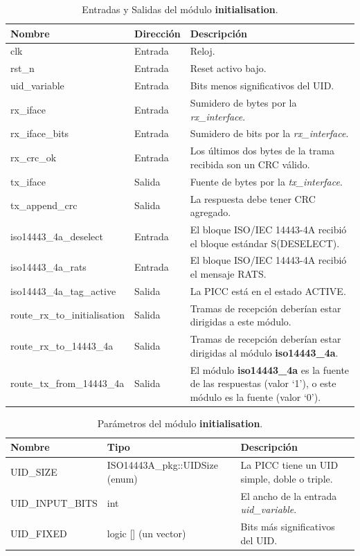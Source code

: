 \documentclass[a4paper, twoside, 11pt]{report}
\begin{document}
\begin{table}[htb]
  \centering
  \tablezebra
  \begin{tabulary}{\linewidth}{l|l|L}
    \textbf{Nombre}&\textbf{Dirección}&\textbf{Descripción} \\
    \hline
    clk&Entrada&Reloj. \\
    rst\_n&Entrada&Reset activo bajo. \\
    uid\_variable&Entrada&Bits menos significativos del UID. \\
    rx\_iface&Entrada&Sumidero de bytes por la \textit{rx\_interface}. \\
    rx\_iface\_bits&Entrada&Sumidero de bits por la \textit{rx\_interface}. \\
    rx\_crc\_ok&Entrada&Los últimos dos bytes de la trama recibida son un CRC válido. \\
    tx\_iface&Salida&Fuente de bytes por la \textit{tx\_interface}. \\
    tx\_append\_crc&Salida&La respuesta debe tener CRC agregado. \\
    iso14443\_4a\_deselect&Entrada&El bloque ISO/IEC 14443-4A recibió el bloque estándar S(DESELECT). \\
    iso14443\_4a\_rats&Entrada&El bloque ISO/IEC 14443-4A recibió el mensaje RATS. \\
    iso14443\_4a\_tag\_active&Salida&La PICC está en el estado ACTIVE. \\
    route\_rx\_to\_initialisation&Salida&Tramas de recepción deberían estar dirigidas a este módulo. \\
    route\_rx\_to\_14443\_4a&Salida&Tramas de recepción deberían estar dirigidas al módulo \textbf{iso14443\_4a}. \\
    route\_tx\_from\_14443\_4a&Salida&El módulo \textbf{iso14443\_4a} es la fuente de las respuestas (valor ‘1’), o este módulo es la fuente (valor ‘0’). \\
  \end{tabulary}
  \caption{Entradas y Salidas del módulo \textbf{initialisation}.}
  \label{tab:ports_initialisation}
\end{table}

\begin{table}[htb]
  \centering
  \tablezebra
  \begin{tabulary}{\linewidth}{l|l|L}
    \setcounter{rownum}{0}
    \textbf{Nombre}&\textbf{Tipo}&\textbf{Descripción} \\
    \hline
    UID\_SIZE&ISO14443A\_pkg::UIDSize (enum)&La PICC tiene un UID simple, doble o triple. \\
    UID\_INPUT\_BITS&int&El ancho de la entrada \textit{uid\_variable}. \\
    UID\_FIXED&logic [] (un vector)&Bits más significativos del UID. \\
  \end{tabulary}
  \caption{Parámetros del módulo \textbf{initialisation}.}
  \label{tab:params_initialisation}
\end{table}
\end{document}
